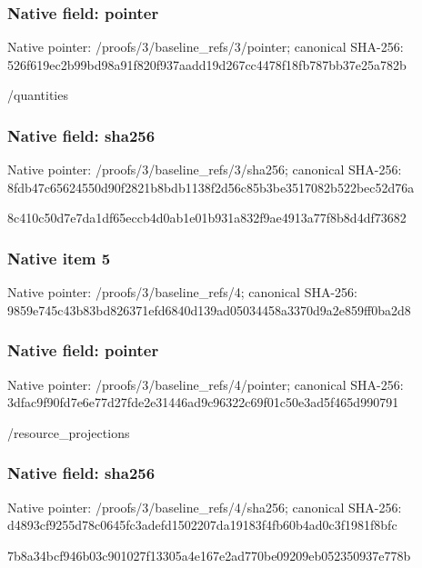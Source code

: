 \documentclass[10pt,a4paper]{article}
\begin{document}
\subsubsection{Native field: pointer}
Native pointer: /proofs/3/baseline\_\allowbreak{}refs/3/pointer; canonical SHA-256: 526f619ec2b99bd98a91f820f937aadd19d267cc4478f18fb787bb37e25a782b

\begingroup\raggedright\sloppy /\allowbreak{}quantities\par\endgroup

\subsubsection{Native field: sha256}
Native pointer: /proofs/3/baseline\_\allowbreak{}refs/3/sha256; canonical SHA-256: 8fdb47c65624550d90f2821b8bdb1138f2d56c85b3be3517082b522bec52d76a

\begingroup\raggedright\sloppy 8c410c50d7e7da1df65eccb4d0ab1e01b931a832f9ae4913a77f8b8d4df73682\par\endgroup

\subsubsection{Native item 5}
Native pointer: /proofs/3/baseline\_\allowbreak{}refs/4; canonical SHA-256: 9859e745c43b83bd826371efd6840d139ad05034458a3370d9a2e859ff0ba2d8

\subsubsection{Native field: pointer}
Native pointer: /proofs/3/baseline\_\allowbreak{}refs/4/pointer; canonical SHA-256: 3dfac9f90fd7e6e77d27fde2e31446ad9c96322c69f01c50e3ad5f465d990791

\begingroup\raggedright\sloppy /\allowbreak{}resource\_\allowbreak{}projections\par\endgroup

\subsubsection{Native field: sha256}
Native pointer: /proofs/3/baseline\_\allowbreak{}refs/4/sha256; canonical SHA-256: d4893cf9255d78c0645fc3adefd1502207da19183f4fb60b4ad0c3f1981f8bfc

\begingroup\raggedright\sloppy 7b8a34bcf946b03c901027f13305a4e167e2ad770be09209eb052350937e778b\par\endgroup
\end{document}
